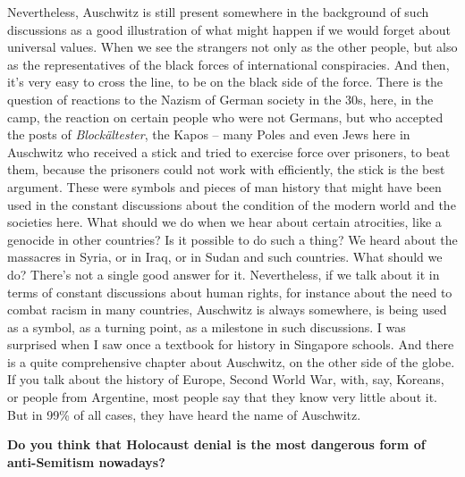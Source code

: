 Nevertheless, Auschwitz is still present somewhere in the background of such discussions as a good illustration of what might happen if we would forget about universal values. When we see the strangers not only as the other people, but also as the representatives of the black forces of international conspiracies. And then, it’s very easy to cross the line, to be on the black side of the force. There is the question of reactions to the Nazism of German society in the 30s, here, in the camp, the reaction on certain people who were not Germans, but who accepted the posts of \textit{Blockältester}, the Kapos – many Poles and even Jews here in Auschwitz who received a stick and tried to exercise force over prisoners, to beat them, because the prisoners could not work with efficiently, the stick is the best argument. These were symbols and pieces of man history that might have been used in the constant discussions about the condition of the modern world and the societies here. What should we do when we hear about certain atrocities, like a genocide in other countries? Is it possible to do such a thing? We heard about the massacres in Syria, or in Iraq, or in Sudan and such countries. What should we do? There’s not a single good answer for it. Nevertheless, if we talk about it in terms of constant discussions about human rights, for instance about the need to combat racism in many countries, Auschwitz is always somewhere, is being used as a symbol, as a turning point, as a milestone in such discussions. I was surprised when I saw once a textbook for history in Singapore schools. And there is a quite comprehensive chapter about Auschwitz, on the other side of the globe. If you talk about the history of Europe, Second World War, with, say, Koreans, or people from Argentine, most people say that they know very little about it. But in 99\% of all cases, they have heard the name of Auschwitz.
 
\textbf{Do you think that Holocaust denial is the most dangerous form of anti-Semitism nowadays?}

